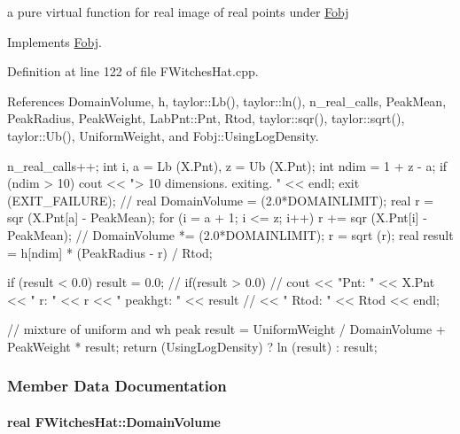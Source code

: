a pure virtual function for real image of real points under \hyperlink{classFobj}{\-Fobj} 



\-Implements \hyperlink{classFobj_a7e89aa4918cf8e40683dde607257d1ee}{\-Fobj}.



\-Definition at line 122 of file \-F\-Witches\-Hat.\-cpp.



\-References \-Domain\-Volume, h, taylor\-::\-Lb(), taylor\-::ln(), n\-\_\-real\-\_\-calls, \-Peak\-Mean, \-Peak\-Radius, \-Peak\-Weight, \-Lab\-Pnt\-::\-Pnt, \-Rtod, taylor\-::sqr(), taylor\-::sqrt(), taylor\-::\-Ub(), \-Uniform\-Weight, and \-Fobj\-::\-Using\-Log\-Density.


\begin{DoxyCode}
{
  n_real_calls++;
  int i, a = Lb (X.Pnt), z = Ub (X.Pnt);
  int ndim = 1 + z - a;
  if (ndim > 10)
  {
    cout << "> 10 dimensions. exiting. " << endl;
    exit (EXIT_FAILURE);
  }
  //  real DomainVolume = (2.0*DOMAINLIMIT);
  real r = sqr (X.Pnt[a] - PeakMean);
  for (i = a + 1; i <= z; i++)
  {
    r += sqr (X.Pnt[i] - PeakMean);
    //  DomainVolume *= (2.0*DOMAINLIMIT);
  }
  r = sqrt (r);
  real result = h[ndim] * (PeakRadius - r) / Rtod;

  if (result < 0.0)
    result = 0.0;
  // if(result > 0.0) 
  //   cout << "Pnt: " << X.Pnt << "  r: "  << r << "  peakhgt: " << result 
  //        << "  Rtod: " << Rtod << endl;
  
  // mixture of uniform and wh peak
  result = UniformWeight / DomainVolume + PeakWeight * result;
  return (UsingLogDensity) ? ln (result) : result;
}
\end{DoxyCode}


\subsubsection{\-Member \-Data \-Documentation}
\hypertarget{classFWitchesHat_a54f305164476a0d3f746be9bf6c48bb9}{
\paragraph[{\-Domain\-Volume}]{\setlength{\rightskip}{0pt plus 5cm}real {\bf \-F\-Witches\-Hat\-::\-Domain\-Volume}}}\label{classFWitchesHat_a54f305164476a0d3f746be9bf6c48bb9}


